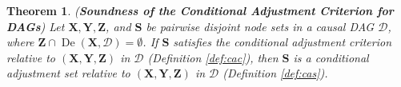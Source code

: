 \documentclass[twoside]{article}
\newtheorem{theorem}{Theorem}
\DeclareMathOperator{\De}{De}
\newcommand{\mb}[1]{\mathbf{#1}}
\newcommand{\g}[1][G]{\mathcal{#1}}
\begin{document}

\begin{theorem}
\label{thm:soundness}
{\normalfont (\textbf{Soundness of the Conditional Adjustment Criterion for DAGs})}
    Let $\mb{X,Y,Z}$, and $\mb{S}$ be pairwise disjoint node sets in a causal DAG $\g[D]$, where $\mb{Z} \cap \De(\mb{X}, \g[D]) = \emptyset$. If $\mb{S}$ satisfies the conditional adjustment criterion relative to $(\mb{X,Y, Z})$ in $\g[D]$ (Definition \ref{def:cac}), then $\mb{S}$ is a conditional adjustment set relative to $(\mb{X,Y,Z})$ in $\g[D]$ (Definition \ref{def:cas}).
\end{theorem}
\end{document}
